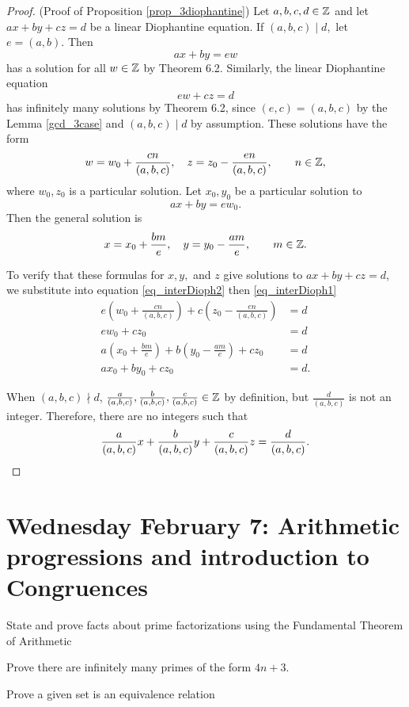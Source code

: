 \documentclass[letterpaper, 11 pt]{ximera}
\begin{document}
\begin{proof}(Proof of Proposition \ref{prop_3diophantine})
    Let $a,b,c,d\in\mathbb Z$ and let $ax+by+cz=d$ be a linear Diophantine equation. If $(a,b,c)\mid d,$ let $e=(a,b).$ 
    Then \begin{equation}\label{eq_interDioph1}ax+by=ew\end{equation} has a solution for all $w\in\mathbb Z$ by Theorem 6.2.
    Similarly, the linear Diophantine equation \begin{equation}\label{eq_interDioph2}
        ew+cz=d
    \end{equation} has infinitely many solutions by Theorem 6.2, since $(e,c)=(a,b,c)$ by the Lemma \ref{gcd_3case} and $(a,b,c)\mid d$ by assumption. These solutions have the form 
    \[w=w_0+\frac{cn}{(a,b,c)},\quad z=z_0-\frac{en}{(a,b,c)},\qquad n\in\mathbb Z,\]
    where $w_0,z_0$ is a particular solution. Let $x_0,y_0$ be a particular solution to \[ax+by=ew_0.\] Then the general solution is 
    \[x=x_0+\frac{bm}{e},\quad y=y_0-\frac{am}{e},\qquad m\in\mathbb Z.\]

    To verify that these formulas for $x,y,$ and $z$ give solutions to $ax+by+cz=d$, we substitute into equation \ref{eq_interDioph2} then \ref{eq_interDioph1}
    \begin{align*}
        e\left(w_0+\frac{cn}{(a,b,c)}\right)+c\left(z_0-\frac{en}{(a,b,c)}\right)&=d\\
        e w_0 + c z_0 & =d\\
        a\left(x_0+\frac{bm}{e}\right)+b\left(y_0-\frac{am}{e}\right)+cz _0 &=d\\
        ax_0+by_0+c z_0&=d.
    \end{align*}

    When $(a,b,c)\nmid d$, $\frac{a}{(a,b,c)},\frac{b}{(a,b,c)},\frac{c}{(a,b,c)}\in\mathbb Z$ by definition, but $\frac{d}{(a,b,c)}$ is not an integer. Therefore, there are no integers such that \[\frac{a}{(a,b,c)}x+\frac{b}{(a,b,c)}y+\frac{c}{(a,b,c)}z=\frac{d}{(a,b,c)}. \qedhere\] 
\end{proof}

\section{Wednesday February 7: Arithmetic progressions and introduction to Congruences}
\begin{obj}
    \item State and prove facts about prime factorizations using the Fundamental Theorem of Arithmetic
    \item Prove there are infinitely many primes of the form $4n+3$.
    \item Prove a given set is an equivalence relation
\end{obj}
\end{document}
